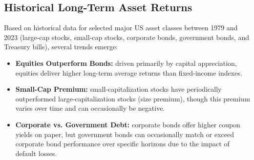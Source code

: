 
\subsection{Historical Long-Term Asset Returns}
	\label{subsec:Historical Long-Term Asset Returns}
Based on historical data for selected major US asset classes between 1979 and 2023 (large-cap stocks, small-cap stocks, corporate bonds, government bonds, and Treasury bills), several trends emerge:
\begin{itemize}
	\item \textbf{Equities Outperform Bonds:} driven primarily by capital appreciation, equities deliver higher long-term average returns than fixed-income indexes.
	\item \textbf{Small-Cap Premium:} small-capitalization stocks have periodically outperformed large-capitalization stocks (size premium), though this premium varies over time and can occasionally be negative.
	\item \textbf{Corporate vs. Government Debt:} corporate bonds offer higher coupon yields on paper, but government bonds can occasionally match or exceed corporate bond performance over specific horizons due to the impact of default losses.
\end{itemize}


